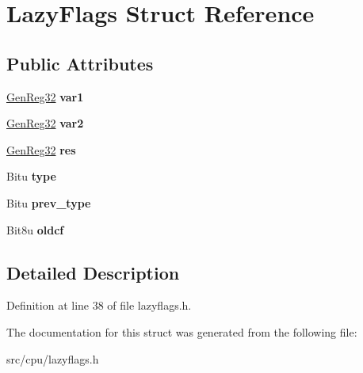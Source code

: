 \hypertarget{structLazyFlags}{\section{Lazy\-Flags Struct Reference}
\label{structLazyFlags}
}
\subsection*{Public Attributes}
\begin{DoxyCompactItemize}
\item 
\hypertarget{structLazyFlags_ac541610d4f91b5d819ceb362c03890f9}{\hyperlink{unionGenReg32}{Gen\-Reg32} {\bfseries var1}}\label{structLazyFlags_ac541610d4f91b5d819ceb362c03890f9}

\item 
\hypertarget{structLazyFlags_a89e15787926574e8e19a139d34f0fd5c}{\hyperlink{unionGenReg32}{Gen\-Reg32} {\bfseries var2}}\label{structLazyFlags_a89e15787926574e8e19a139d34f0fd5c}

\item 
\hypertarget{structLazyFlags_af45822403f24e53a96b97b37ba57a634}{\hyperlink{unionGenReg32}{Gen\-Reg32} {\bfseries res}}\label{structLazyFlags_af45822403f24e53a96b97b37ba57a634}

\item 
\hypertarget{structLazyFlags_a38008372e61ad21ee5eb5c4feb83f249}{Bitu {\bfseries type}}\label{structLazyFlags_a38008372e61ad21ee5eb5c4feb83f249}

\item 
\hypertarget{structLazyFlags_a5c19c6e73d0cd511747fc6fe2e265751}{Bitu {\bfseries prev\-\_\-type}}\label{structLazyFlags_a5c19c6e73d0cd511747fc6fe2e265751}

\item 
\hypertarget{structLazyFlags_a2fdb2bb4cecb6f916a7a998c667a0b67}{Bit8u {\bfseries oldcf}}\label{structLazyFlags_a2fdb2bb4cecb6f916a7a998c667a0b67}

\end{DoxyCompactItemize}


\subsection{Detailed Description}


Definition at line 38 of file lazyflags.\-h.



The documentation for this struct was generated from the following file\-:\begin{DoxyCompactItemize}
\item 
src/cpu/lazyflags.\-h\end{DoxyCompactItemize}
